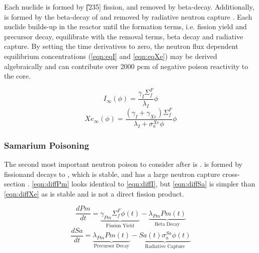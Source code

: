 Each nuclide is formed by \U[235] fission, and removed by beta-decay. Additionally, \Xe is formed by the beta-decay of \I and removed by radiative neutron capture \footnotemark. Each nuclide builds-up in the reactor until the formation terms, i.e. fission yield and precursor decay, equilibrate with the removal terms, beta decay and radiative capture. By setting the time derivatives to zero, the neutron flux dependent equilibrium concentrations (\ref{eqn:eqI} and \ref{eqn:eqXe}) may be derived algebraically \cite[Ch. 7]{Lamarsh} and can contribute over 2000 pcm of negative poison reactivity to the core. 

 
\begin{equation}\label{eqn:eqI}
    I_{\infty}(\phi) = \frac{\gamma_I \Sigma_f^F }{\lambda_I}\phi
\end{equation}
\begin{equation}\label{eqn:eqXe}
    Xe_{\infty}(\phi) = \frac{(\gamma_I+\gamma_{Xe}) \Sigma_f^F }{\lambda_I+\sigma_a^{Xe}\phi}\phi
\end{equation}

\subsubsection{Samarium Poisoning}
The second most important neutron poison to consider after \Xe is \Sa. \Pm is formed by fission\footnotemark and decays to \Sa, which is stable, and has a large neutron capture cross-section \cite[Ch. 7]{Lamarsh}. \ref{eqn:diffPm} looks identical to \ref{eqn:diffI}, but \ref{eqn:diffSa} is simpler than \ref{eqn:diffXe} as \Sa is stable and is not a direct fission product.


\begin{equation}\label{eqn:diffPm}
    \frac{dPm}{dt} =
    \underbrace{\gamma_{Pm}\Sigma_{f}^{F}{\phi}(t)}_{\text{Fission Yield}}
    -\underbrace{\lambda_{Pm}Pm(t)}_{\text{Beta Decay}}
\end{equation}
\begin{equation}\label{eqn:diffSa}
        \frac{dSa}{dt} =
        \underbrace{\lambda_{Pm}Pm(t)}_{\text{Precursor Decay}}
        -
        \underbrace{Sa(t)\sigma_{a}^{Sa}{\phi}(t)}_{\text{Radiative Capture}}
\end{equation}

